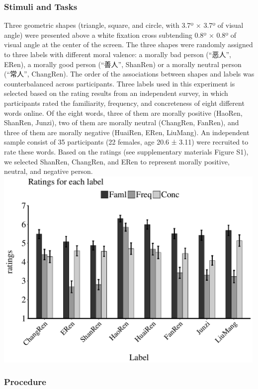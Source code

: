 \documentclass[
  english,
  man]{apa6}
\begin{document}
\hypertarget{stimuli-and-tasks-1}{%
\subsubsection{Stimuli and Tasks}\label{stimuli-and-tasks-1}}

Three geometric shapes (triangle, square, and circle, with 3.7º × 3.7º of visual angle) were presented above a white fixation cross subtending 0.8º × 0.8º of visual angle at the center of the screen. The three shapes were randomly assigned to three labels with different moral valence: a morally bad person (\enquote{恶人}, ERen), a morally good person (\enquote{善人}, ShanRen) or a morally neutral person (\enquote{常人}, ChangRen). The order of the associations between shapes and labels was counterbalanced across participants.
Three labels used in this experiment is selected based on the rating results from an independent survey, in which participants rated the familiarity, frequency, and concreteness of eight different words online. Of the eight words, three of them are morally positive (HaoRen, ShanRen, Junzi), two of them are morally neutral (ChangRen, FanRen), and three of them are morally negative (HuaiRen, ERen, LiuMang). An independent sample consist of 35 participants (22 females, age 20.6 ± 3.11) were recruited to rate these words. Based on the ratings (see supplementary materials Figure S1), we selected ShanRen, ChangRen, and ERen to represent morally positive, neutral, and negative person.
\includegraphics[width=5.20833in,height=\textheight]{exp1b/Familiarity_ratings/df1b_fami_rating.pdf}

\hypertarget{procedure-1}{%
\subsubsection{Procedure}\label{procedure-1}}
\end{document}
